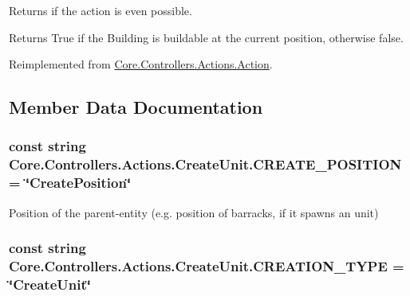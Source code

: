 Returns if the action is even possible. 

\begin{DoxyReturn}{Returns}
True if the Building is buildable at the current position, otherwise false.
\end{DoxyReturn}


Reimplemented from \hyperlink{classCore_1_1Controllers_1_1Actions_1_1Action_a405b995343a9394ad19e05a699a4e6d9}{Core.\+Controllers.\+Actions.\+Action}.



\subsection{Member Data Documentation}
\hypertarget{classCore_1_1Controllers_1_1Actions_1_1CreateUnit_a35a30a8393a155c7bb8e76ecc8c08874}{}
\subsubsection[{C\+R\+E\+A\+T\+E\+\_\+\+P\+O\+S\+I\+T\+I\+O\+N}]{\setlength{\rightskip}{0pt plus 5cm}const string Core.\+Controllers.\+Actions.\+Create\+Unit.\+C\+R\+E\+A\+T\+E\+\_\+\+P\+O\+S\+I\+T\+I\+O\+N = \char`\"{}Create\+Position\char`\"{}}\label{classCore_1_1Controllers_1_1Actions_1_1CreateUnit_a35a30a8393a155c7bb8e76ecc8c08874}


Position of the parent-\/entity (e.\+g. position of barracks, if it spawns an unit) 

\hypertarget{classCore_1_1Controllers_1_1Actions_1_1CreateUnit_a2df09d9a45946983c9d5d0ee08a0b4a3}{}
\subsubsection[{C\+R\+E\+A\+T\+I\+O\+N\+\_\+\+T\+Y\+P\+E}]{\setlength{\rightskip}{0pt plus 5cm}const string Core.\+Controllers.\+Actions.\+Create\+Unit.\+C\+R\+E\+A\+T\+I\+O\+N\+\_\+\+T\+Y\+P\+E = \char`\"{}Create\+Unit\char`\"{}}\label{classCore_1_1Controllers_1_1Actions_1_1CreateUnit_a2df09d9a45946983c9d5d0ee08a0b4a3}


